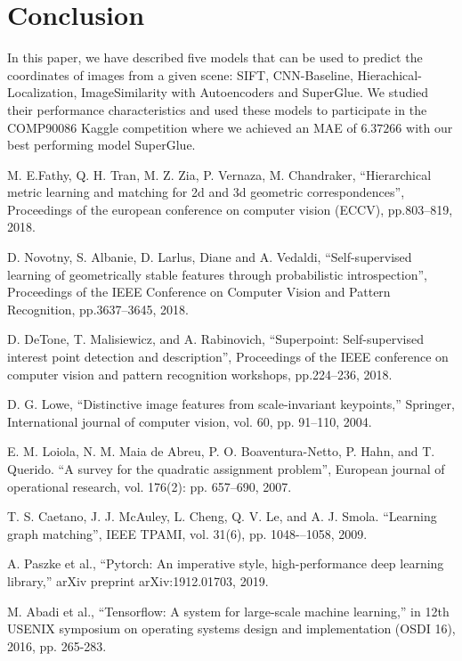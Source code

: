 \documentclass[conference]{IEEEtran}
\begin{document}
\section{Conclusion}
In this paper, we have described five models that can be used to predict the coordinates of images from a given scene: SIFT, CNN-Baseline, Hierachical-Localization, ImageSimilarity with Autoencoders and SuperGlue. We studied their performance characteristics and used these models to participate in the COMP90086 Kaggle competition where we achieved an MAE of $6.37266$ with our best performing model SuperGlue.


\begin{thebibliography}{00}
 M. E.Fathy, Q. H. Tran, M. Z. Zia, P. Vernaza, M. Chandraker, ``Hierarchical metric learning and matching for 2d and 3d geometric correspondences'', Proceedings of the european conference on computer vision (ECCV), pp.803--819, 2018.

 D. Novotny, S. Albanie, D. Larlus, Diane and A. Vedaldi, ``Self-supervised learning of geometrically stable features through probabilistic introspection'', Proceedings of the IEEE Conference on Computer Vision and Pattern Recognition, pp.3637--3645, 2018.

 D. DeTone, T. Malisiewicz, and A. Rabinovich, ``Superpoint: Self-supervised interest point detection and description'', Proceedings of the IEEE conference on computer vision and pattern recognition workshops, pp.224--236, 2018.

 D. G. Lowe, ``Distinctive image features from scale-invariant keypoints,'' Springer, International journal of computer vision, vol. 60, pp. 91--110, 2004.

 E. M. Loiola, N. M. Maia de Abreu, P. O.
Boaventura-Netto, P. Hahn, and T. Querido. ``A
survey for the quadratic assignment problem'', European journal
of operational research, vol. 176(2): pp. 657--690, 2007.

 T. S. Caetano, J. J. McAuley, L. Cheng, Q. V. Le,
and A. J. Smola. ``Learning graph matching'', IEEE TPAMI,
vol. 31(6), pp. 1048-–1058, 2009.

 A. Paszke et al., ``Pytorch: An imperative style, high-performance deep learning library,'' arXiv preprint arXiv:1912.01703, 2019.

  M. Abadi et al., ``Tensorflow: A system for large-scale machine learning,'' in 12th {USENIX} symposium on operating systems design and implementation ({OSDI} 16), 2016, pp. 265-283. 


\end{thebibliography}
\end{document}

